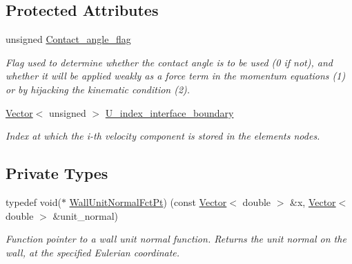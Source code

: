 \subsection*{Protected Attributes}
\begin{DoxyCompactItemize}
\item 
unsigned \hyperlink{classoomph_1_1FluidInterfaceBoundingElement_affa8d787e58ca23c2e73b4c8a2c30766}{Contact\+\_\+angle\+\_\+flag}
\begin{DoxyCompactList}\small\item\em Flag used to determine whether the contact angle is to be used (0 if not), and whether it will be applied weakly as a force term in the momentum equations (1) or by hijacking the kinematic condition (2). \end{DoxyCompactList}\item 
\hyperlink{classoomph_1_1Vector}{Vector}$<$ unsigned $>$ \hyperlink{classoomph_1_1FluidInterfaceBoundingElement_a08223fefc36922f4661e30e9de16830f}{U\+\_\+index\+\_\+interface\+\_\+boundary}
\begin{DoxyCompactList}\small\item\em Index at which the i-\/th velocity component is stored in the element\textquotesingle{}s nodes. \end{DoxyCompactList}\end{DoxyCompactItemize}
\subsection*{Private Types}
\begin{DoxyCompactItemize}
\item 
typedef void($\ast$ \hyperlink{classoomph_1_1FluidInterfaceBoundingElement_a09c0b1df7d653eaf55e94e3951d409dd}{Wall\+Unit\+Normal\+Fct\+Pt}) (const \hyperlink{classoomph_1_1Vector}{Vector}$<$ double $>$ \&x, \hyperlink{classoomph_1_1Vector}{Vector}$<$ double $>$ \&unit\+\_\+normal)
\begin{DoxyCompactList}\small\item\em Function pointer to a wall unit normal function. Returns the unit normal on the wall, at the specified Eulerian coordinate. \end{DoxyCompactList}\end{DoxyCompactItemize}
